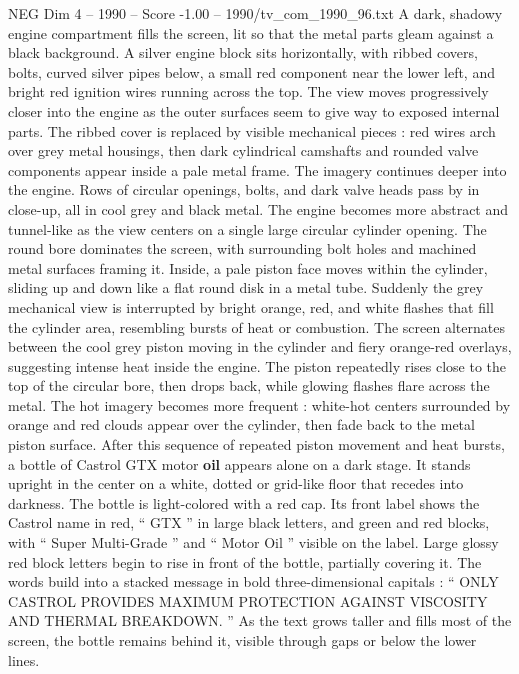 \begin{textsample}{NEG Dim 4 – 1990 – Score -1.00 – 1990/tv\_com\_1990\_96.txt}  \label{ex:f4_neg_025}
A dark, shadowy engine compartment fills the screen, lit so that the metal parts gleam against a black background.
A silver engine block sits horizontally, with ribbed covers, bolts, curved silver pipes below, a small red component near the lower left, and bright red ignition wires running across the top.
The view moves progressively closer into the engine as the outer surfaces seem to give way to exposed internal parts.
The ribbed cover is replaced by visible mechanical pieces : red wires arch over grey metal housings, then dark cylindrical camshafts and rounded valve components appear inside a pale metal frame.
The imagery continues deeper into the engine.
Rows of circular openings, bolts, and dark valve heads pass by in close-up, all in cool grey and black metal.
The engine becomes more abstract and tunnel-like as the view centers on a single large circular cylinder opening.
The round bore dominates the screen, with surrounding bolt holes and machined metal surfaces framing it.
Inside, a pale piston face moves within the cylinder, sliding up and down like a flat round disk in a metal tube.
Suddenly the grey mechanical view is interrupted by bright orange, red, and white flashes that fill the cylinder area, resembling bursts of heat or combustion.
The screen alternates between the cool grey piston moving in the cylinder and fiery orange-red overlays, suggesting intense heat inside the engine.
The piston repeatedly rises close to the top of the circular bore, then drops back, while glowing flashes flare across the metal.
The hot imagery becomes more frequent : white-hot centers surrounded by orange and red clouds appear over the cylinder, then fade back to the metal piston surface.
After this sequence of repeated piston movement and heat bursts, a bottle of Castrol GTX motor \textbf{oil} appears alone on a dark stage.
It stands upright in the center on a white, dotted or grid-like floor that recedes into darkness.
The bottle is light-colored with a red cap.
Its front label shows the Castrol name in red, “ GTX ” in large black letters, and green and red blocks, with “ Super Multi-Grade ” and “ Motor Oil ” visible on the label.
Large glossy red block letters begin to rise in front of the bottle, partially covering it.
The words build into a stacked message in bold three-dimensional capitals : “ ONLY CASTROL PROVIDES MAXIMUM PROTECTION AGAINST VISCOSITY AND THERMAL BREAKDOWN. ” As the text grows taller and fills most of the screen, the bottle remains behind it, visible through gaps or below the lower lines.

\end{textsample}
